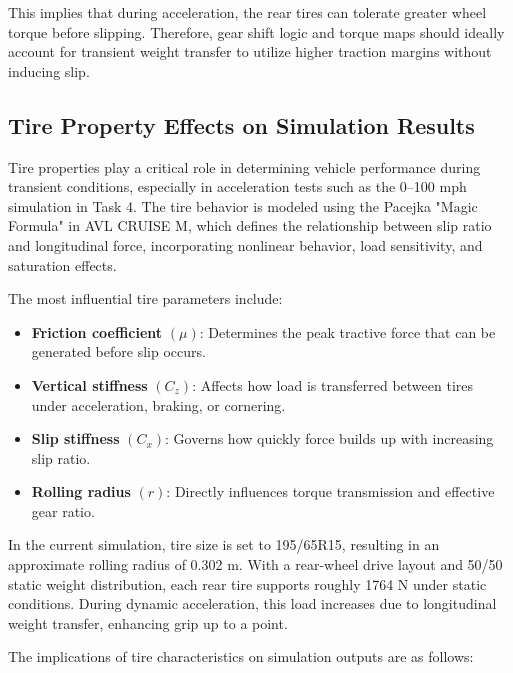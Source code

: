 This implies that during acceleration, the rear tires can tolerate greater wheel torque before slipping. Therefore, gear shift logic and torque maps should ideally account for transient weight transfer to utilize higher traction margins without inducing slip.

\subsection{Tire Property Effects on Simulation Results}

Tire properties play a critical role in determining vehicle performance during transient conditions, especially in acceleration tests such as the 0--100 mph simulation in Task 4. The tire behavior is modeled using the Pacejka "Magic Formula" in AVL CRUISE M, which defines the relationship between slip ratio and longitudinal force, incorporating nonlinear behavior, load sensitivity, and saturation effects.

The most influential tire parameters include:

\begin{itemize}
  \item \textbf{Friction coefficient} $(\mu)$: Determines the peak tractive force that can be generated before slip occurs.
  \item \textbf{Vertical stiffness} $(C_z)$: Affects how load is transferred between tires under acceleration, braking, or cornering.
  \item \textbf{Slip stiffness} $(C_x)$: Governs how quickly force builds up with increasing slip ratio.
  \item \textbf{Rolling radius} $(r)$: Directly influences torque transmission and effective gear ratio.
\end{itemize}

In the current simulation, tire size is set to 195/65R15, resulting in an approximate rolling radius of 0.302 m. With a rear-wheel drive layout and 50/50 static weight distribution, each rear tire supports roughly 1764 N under static conditions. During dynamic acceleration, this load increases due to longitudinal weight transfer, enhancing grip up to a point.

The implications of tire characteristics on simulation outputs are as follows:

